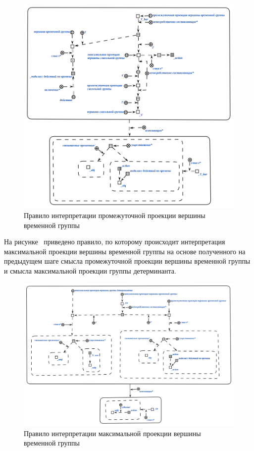\begin{figure}[h]
    \centering
    \includegraphics[scale=0.8]{images/part2/chapter_lang/d_sem_5}
    \caption{Правило интерпретации промежуточной проекции вершины временной группы}
    \label{fig:d_sem_5}
\end{figure}

На рисунке~\textit{} приведено правило, по которому происходит интерпретация максимальной проекции вершины временной группы на основе полученного на предыдущем шаге смысла промежуточной проекции вершины временной группы и смысла максимальной проекции группы детерминанта.

\begin{figure}[h]
    \centering
    \includegraphics[scale=0.8]{images/part2/chapter_lang/d_sem_6}
    \caption{Правило интерпретации максимальной проекции вершины временной группы}
    \label{fig:d_sem_6}
\end{figure}

